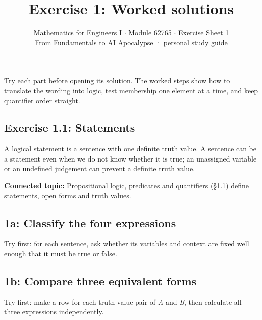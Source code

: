 \documentclass[11pt]{article}
\title{\sffamily\bfseries\color{FAUblue}Exercise 1: Worked solutions}
\author{Mathematics for Engineers I \ensuremath{\cdot} Module 62765 \ensuremath{\cdot} Exercise Sheet 1\\[2pt]\small From Fundamentals to AI Apocalypse · personal study guide}
\date{}
\begin{document}
\maketitle
\begingroup\footnotesize\setlength{\parskip}{0pt}\tableofcontents\endgroup
\clearpage

{\large Try each part before opening its solution. The worked steps show how to translate the wording into logic, test membership one element at a time, and keep quantifier order straight.}


\begin{keepsection}
\section{Exercise 1.1: Statements}

A logical statement is a sentence with one definite truth value. A sentence can be a statement even when we do not know whether it is true; an unassigned variable or an undefined judgement can prevent a definite truth value.

\textbf{Connected topic:} Propositional logic, predicates and quantifiers (§1.1) define statements, open forms and truth values.

\begin{keepsection}
\subsection{1a: Classify the four expressions}

Try first: for each sentence, ask whether its variables and context are fixed well enough that it must be true or false.

\end{keepsection}

\begin{keepsection}
\subsection{1b: Compare three equivalent forms}

Try first: make a row for each truth-value pair of \textit{A} and \textit{B}, then calculate all three expressions independently.

\end{keepsection}


\end{keepsection}
\end{document}
